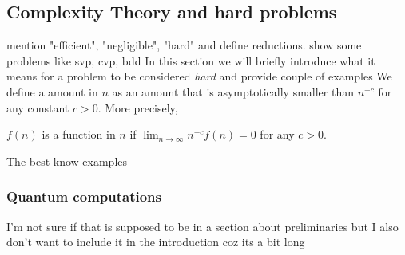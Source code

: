 \begin{definition}

\end{definition}



\subsection{Complexity Theory and hard problems} 
\label{hardness}
mention "efficient", "negligible", "hard" and define reductions. show some problems like svp, cvp, bdd
In this section we will briefly introduce what it means for a problem to be considered \textit{hard} and provide couple of examples
We define a  amount in $n$ as an amount that is asymptotically smaller than $n^{-c}$ for any constant $c > 0$. More precisely, 
\begin{definition}\label{negl}
    $f (n)$ is a  function in $n$ if $\lim_{n \to \infty}n^{-c} f (n) = 0$ for any $c > 0$.
\end{definition}
The best know examples
\subsubsection*{Quantum computations}

I'm not sure if that is supposed to be in a section about preliminaries but I also don't want to include it in the introduction coz its a bit long

